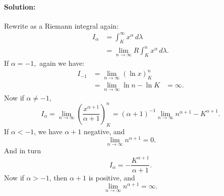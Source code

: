 \documentclass{article}
\begin{document}
\paragraph{Solution: } Rewrite as a Riemann integral again:
\begin{align*}
    I_\alpha&=  \int_{K}^{\infty} x^{\alpha} \, d \lambda\\
            &= \lim_{n\to\infty} R \int_{K}^{n}x^{\alpha}  \, d \lambda
.\end{align*}
If $\alpha=-1,$ again we have:
\begin{align*}
    I_{-1}&=\lim_{n\to\infty}  \left( \ln x \right) ^{n}_{K} \\
    &= \lim_{n\to\infty} \ln n-\ln K
    &= \infty
.\end{align*}
Now if $\alpha\neq -1$, 
\[
I_\alpha=\lim_{n\to\infty} \left( \frac{x^{\alpha+1}}{\alpha+1} \right) ^{n}_{K}=\left( \alpha+1 \right) ^{-1}\lim_{n\to\infty} n^{\alpha+1}-K^{\alpha+1}
.\] 
If $\alpha<-1$, we have $\alpha+1$ negative, and 
\[
\lim_{n\to\infty} n^{\alpha+1}=0
.\] 
And in turn 
\[
I_\alpha=-\frac{K^{\alpha+1}}{\alpha+1}
.\] 
Now if $\alpha>-1$, then $\alpha+1$ is positive, and 
\[
\lim_{n\to\infty} n^{\alpha+1}=\infty
.\] 
\end{document}
